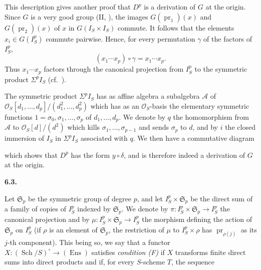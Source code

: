 This description gives another proof that \(D^p\) is a
derivation of \(G\) at the origin. Since \(G\) is a very good
group (II, ), the images \(G(\operatorname{pr}_1)(x)\) and
\(G(\operatorname{pr}_2)(x)\) of \(x\) in
\(G(I_S\times I_S)\) commute. It follows that the elements
\(x_i\in G(I_S^p)\) commute pairwise. Hence, for every
permutation \(\gamma\) of the factors of \(I_S^p\),
\[
  (x_1\cdots x_p)\circ\gamma=x_1\cdots x_p.
\]
Thus \(x_1\cdots x_p\) factors through the canonical projection
from \(I_S^p\) to the symmetric product \(\Sigma^p I_S\)
(cf.\ ).

The symmetric product \(\Sigma^p I_S\) has as affine algebra a
subalgebra \(\mathcal A\) of
\(\mathcal O_S[d_1,\ldots,d_p]/\allowbreak(d_1^2,\ldots,d_p^2)\) which has as an
\(\mathcal O_S\)-basis the elementary symmetric functions
\(1=\sigma_0,\sigma_1,\ldots,\sigma_p\) of \(d_1,\ldots,d_p\). We denote by
\(q\) the homomorphism from \(\mathcal A\) to \(\mathcal O_S[d]/(d^2)\)
which kills \(\sigma_1,\ldots,\sigma_{p-1}\) and sends \(\sigma_p\) to
\(d\), and by \(i\) the closed immersion of \(I_S\) in
\(\Sigma^p I_S\) associated with \(q\). We then have a commutative
diagram
\begin{center}
  \label{sga3:VIIA:6.2-symbolic-power-commutative-diagram}
  
\end{center}
which shows that \(D^p\) has the form \(y\circ\delta\), and is
therefore indeed a derivation of \(G\) at the origin.

\medskip
\noindent\textbf{6.3.}
\label{sga3:VIIA:6.3}

Let \(\mathfrak S_p\) be the symmetric group of degree \(p\),
and let \(I_S^p\times\mathfrak S_p\) be the direct sum of a family of
copies of \(I_S^p\) indexed by \(\mathfrak S_p\). We denote by
\(\pi:I_S^p\times\mathfrak S_p\to I_S^p\) the canonical projection and
by \(\mu:I_S^p\times\mathfrak S_p\to I_S^p\) the morphism defining the
action of \(\mathfrak S_p\) on \(I_S^p\) (if \(\rho\) is an element of
\(\mathfrak S_p\), the restriction of \(\mu\) to \(I_S^p\times\rho\) has
\(\operatorname{pr}_{\rho(j)}\) as its \(j\)-th component). This being
so, we say that a functor
\(X:(\operatorname{Sch}/S)^\circ\to(\operatorname{Ens})\) satisfies
\emph{condition (F)} if \(X\) transforms finite direct sums into direct
products and if, for every \(S\)-scheme \(T\), the sequence
\begin{center}
  \label{sga3:VIIA:6.3-conditionF-equalizer}
  
\end{center}

